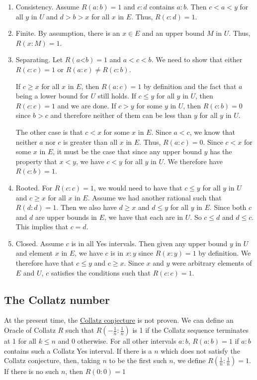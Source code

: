 \documentclass[12pt]{article}
\theoremstyle{remark}
\newcommand{\lt}{\mathord{<}}
\begin{document}
\begin{enumerate}
    \item Consistency. Assume $R(a:b)=1$ and $c:d$ contains $a:b$. Then $c < a < y$ for all $y$ in $U$ and $d > b > x$ for all $x$ in $E$. Thus, $R(c:d) = 1$.
    \item Finite. By assumption, there is an $x \in E$ and an upper bound $M$ in $U$. Thus, $R(x:M) = 1$. 
    \item Separating. Let $R(a\lt b)=1$ and $a < c< b$. We need to show that either $R(c:c)=1$ or $R(a:c) \neq R(c:b)$. 
    
    If $c \geq x$ for all $x$ in $E$, then $R(a:c)=1$ by definition and the fact that $a$ being a lower bound for $U$ still holds. If $c \leq y$ for all $y$ in $U$, then $R(c:c)=1$ and we are done. If $c > y$ for some $y$ in $U$, then $R(c:b) = 0$ since $b > c$ and therefore neither of them can be less than $y$ for all $y$ in $U$. 
    
    The other case is that $c < x$ for some $x$ in $E$. Since $a < c$, we know that neither $a$ nor $c$ is greater than all $x$ in $E$. Thus, $R(a:c) = 0$. Since $c < x$ for some $x$ in $E$, it must be the case that since any upper bound $y$ has the property that $x < y$, we have $c < y$ for all $y$ in $U$. We therefore have $R(c:b)=1$.
    
    \item Rooted. For $R(c:c)=1$, we would need to have that $c \leq y$ for all $y$ in $U$ and $c \geq x$ for all $x$ in $E$. Assume we had another rational such that $R(d:d) = 1$. Then we also have $d \geq x$ and $d \leq y$ for all $y$ in $E$. Since both $c$ and $d$ are upper bounds in $E$, we have that each are in $U$. So $c \leq d$ and $d \leq c$. This implies that $c = d$. 
    \item Closed. Assume $c$ is in all Yes intervals. Then given any upper bound $y$ in $U$ and element $x$ in $E$, we have $c$ is in $x:y$ since $R(x:y)=1$ by definition. We therefore have that $c \leq y$ and $c \geq x$. Since $x$ and $y$ were arbitrary elements of $E$ and $U$, $c$ satisfies the conditions such that $R(c:c)=1$.
\end{enumerate}


\subsection{The Collatz number}

At the present time, the \href{https://en.wikipedia.org/wiki/Collatz_conjecture}{Collatz conjecture} is not proven. We can define an Oracle of Collatz $R$ such that $R(-\tfrac{1}{n}:\tfrac{1}{n})$ is 1 if the Collatz sequence terminates at 1 for all $k \leq n$ and 0 otherwise. For all other intervals $a:b$, $R(a:b) = 1$ if $a:b$ contains such a Collatz Yes interval. If there is a $n$ which does not satisfy the Collatz conjecture, then, taking $n$ to be the first such $n$, we define $R(\tfrac{1}{n}:\tfrac{1}{n}) = 1$. If there is no such $n$, then $R(0:0) = 1$
\end{document}
